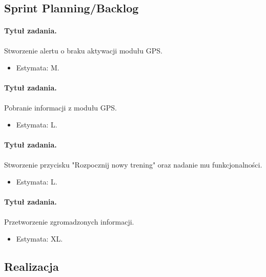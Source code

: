 \documentclass[a4paper]{article}
\begin{document}
\subsection{Sprint Planning/Backlog}

\paragraph{Tytuł zadania.} Stworzenie alertu o braku aktywacji modułu GPS.
\begin{itemize}
\item Estymata: M.
\end{itemize}

\paragraph{Tytuł zadania.} Pobranie informacji z modułu GPS.
\begin{itemize}
\item Estymata: L.
\end{itemize}

\paragraph{Tytuł zadania.} Stworzenie przycisku "Rozpocznij nowy trening" oraz nadanie mu funkcjonalności.
\begin{itemize}
\item Estymata: L.
\end{itemize}

\paragraph{Tytuł zadania.} Przetworzenie zgromadzonych informacji.
\begin{itemize}
\item Estymata: XL.
\end{itemize}

\subsection{Realizacja}
\end{document}
